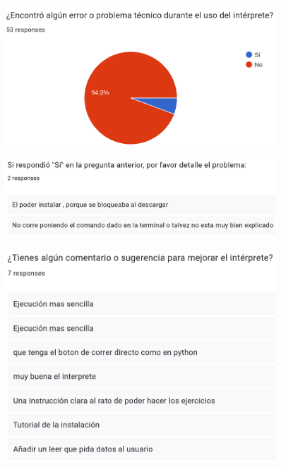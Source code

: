 \begin{figure}[!h]
  \includegraphics*[width=0.9\textwidth]{images/ap08.png}
\end{figure}
\begin{figure}[!h]
  \includegraphics*[width=0.9\textwidth]{images/ap09.png}
\end{figure}
\begin{figure}[!h]
  \includegraphics*[width=0.9\textwidth]{images/ap10.png}
\end{figure}

\chapter*{}
\vspace*{-5em}
